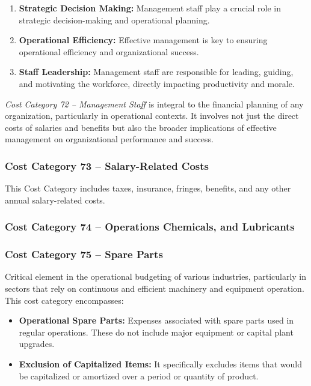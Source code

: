 \begin{enumerate}
    \item \textbf{Strategic Decision Making:} Management staff play a crucial role in strategic decision-making and operational planning.
    \item \textbf{Operational Efficiency:} Effective management is key to ensuring operational efficiency and organizational success.
    \item \textbf{Staff Leadership:} Management staff are responsible for leading, guiding, and motivating the workforce, directly impacting productivity and morale.
\end{enumerate}

\textit{Cost Category 72 – Management Staff} is integral to the financial planning of any organization, particularly in operational contexts. It involves not just the direct costs of salaries and benefits but also the broader implications of effective management on organizational performance and success.

\subsubsection*{Cost Category 73 – Salary-Related Costs}
This Cost Category includes taxes, insurance, fringes, benefits, and any other annual salary-related costs.

\subsubsection*{Cost Category 74 – Operations Chemicals, and Lubricants}

\subsubsection*{Cost Category 75 – Spare Parts}
Critical element in the operational budgeting of various industries, particularly in sectors that rely on continuous and efficient machinery and equipment operation.  This cost category encompasses:

\begin{itemize}
    \item \textbf{Operational Spare Parts:} Expenses associated with spare parts used in regular operations. These do not include major equipment or capital plant upgrades.
    \item \textbf{Exclusion of Capitalized Items:} It specifically excludes items that would be capitalized or amortized over a period or quantity of product.
\end{itemize}

